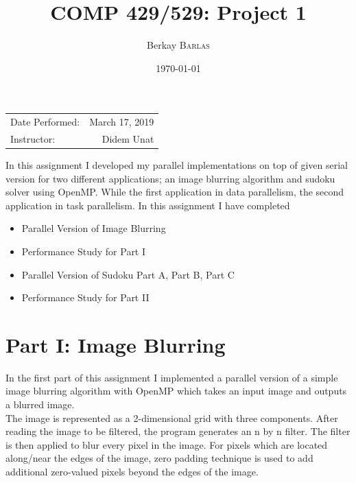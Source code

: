 \documentclass{article}
\title{COMP 429/529: Project 1} %
\author{Berkay \textsc{Barlas}} %
\date{\today} %
\newcommand\tab[1][0.5cm]{\hspace*{#1}}
\begin{document}
\maketitle %

\begin{center}
\begin{tabular}{l r}
Date Performed: & March 17, 2019 \\ %
Instructor: & Didem Unat %
\end{tabular}
\end{center}



In this assignment I developed my parallel implementations 
on top of given serial version for two different applications;
\newline an image blurring algorithm and sudoku solver using OpenMP. 
\newline While the first application in data parallelism, 
the second application in task parallelism. 
\newline
\newline
In this assignment I have completed
\begin{itemize}
    \item Parallel Version of Image Blurring
    \item Performance Study for Part I
    \item Parallel Version of Sudoku Part A, Part B, Part C
    \item Performance Study for Part II 
\end{itemize}


\section{Part I: Image Blurring}


\tab{} In the first part of this assignment I implemented a parallel version of a simple image blurring algorithm with OpenMP which takes an input image and outputs a blurred image.
\\
\tab{} The image is represented as a 2-dimensional grid with three components.  
After reading the image to be filtered, the program generates an n by n filter. 
The filter is then applied to blur every pixel in the image. 
For pixels which are located along/near the edges of the image, zero padding technique is used to add additional zero-valued pixels beyond the edges of the image.
\end{document}
